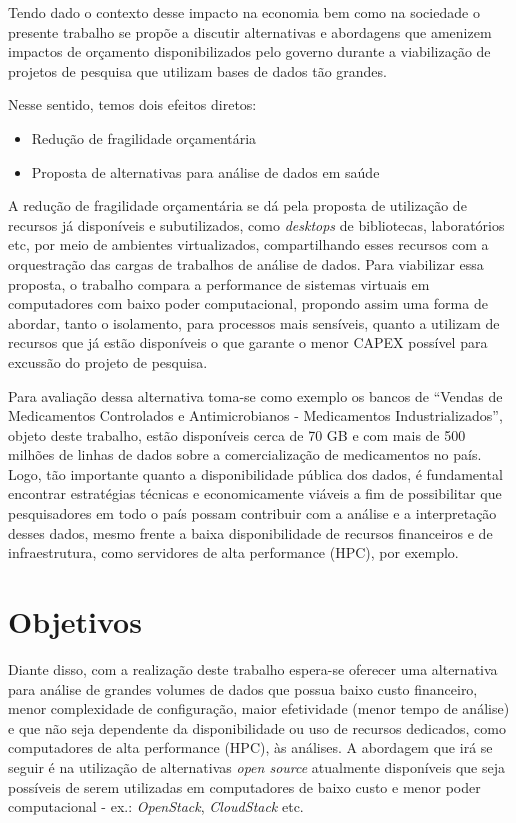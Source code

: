Tendo dado o contexto desse impacto na economia bem como na sociedade o presente trabalho se propõe a discutir alternativas e abordagens que amenizem impactos de orçamento disponibilizados pelo governo durante a viabilização de projetos de pesquisa que utilizam bases de dados tão grandes.

Nesse sentido, temos dois efeitos diretos:

\begin{itemize}
    \item Redução de fragilidade orçamentária
    \item Proposta de alternativas para análise de dados em saúde
\end{itemize}

A redução de fragilidade orçamentária se dá pela proposta de utilização de recursos já disponíveis e subutilizados, como \emph{desktops} de bibliotecas, laboratórios etc, por meio de ambientes virtualizados, compartilhando esses recursos com a orquestração das cargas de trabalhos de análise de dados. Para viabilizar essa proposta, o trabalho compara a performance de sistemas virtuais em computadores com baixo poder computacional, propondo assim uma forma de abordar, tanto o isolamento, para processos mais sensíveis, quanto a utilizam de recursos que já estão disponíveis o que garante o menor CAPEX possível para excussão do projeto de pesquisa. 

Para avaliação dessa alternativa toma-se como exemplo os bancos de “Vendas de Medicamentos Controlados e Antimicrobianos - Medicamentos Industrializados”, objeto deste trabalho, estão disponíveis cerca de 70 GB e com mais de 500 milhões de linhas de dados sobre a comercialização de medicamentos no país. Logo, tão importante quanto a disponibilidade pública dos dados, é fundamental encontrar estratégias técnicas e economicamente viáveis a fim de possibilitar que pesquisadores em todo o país possam contribuir com a análise e a interpretação desses dados, mesmo frente a baixa disponibilidade de recursos financeiros e de infraestrutura, como servidores de alta performance (HPC), por exemplo.

\section{Objetivos}
\label{sec:objetivos}
Diante disso, com a realização deste trabalho espera-se oferecer uma alternativa para análise de grandes volumes de dados que possua baixo custo financeiro, menor complexidade de configuração, maior efetividade (menor tempo de análise) e que não seja dependente da disponibilidade ou uso de recursos dedicados, como computadores de alta performance (HPC), às análises. A abordagem que irá se seguir é na utilização de alternativas \emph{open source} atualmente disponíveis que seja possíveis de serem utilizadas em computadores de baixo custo e menor poder computacional - ex.: \emph{OpenStack}, \emph{CloudStack} etc.

